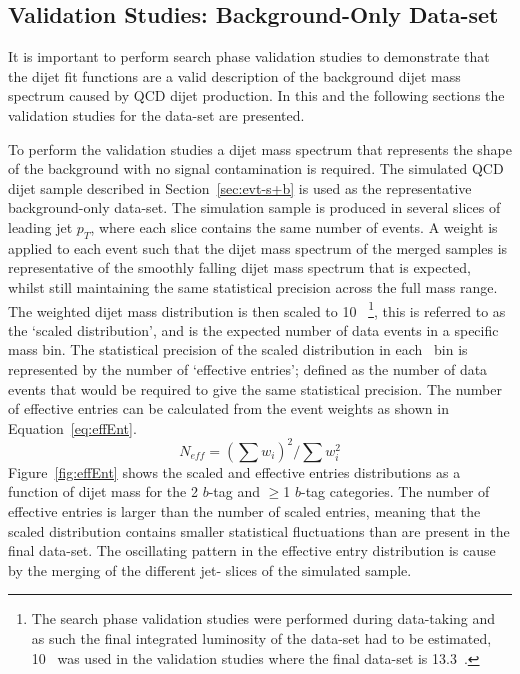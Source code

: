 \subsection{Validation Studies: Background-Only Data-set}
\label{sec:bkg-summer_fitCR}

It is important to perform search phase validation studies to demonstrate
that the dijet fit functions are a valid description of the background dijet mass spectrum caused by QCD dijet production.
In this and the following sections the validation studies for the \summer{} data-set are presented.

To perform the validation studies a dijet mass spectrum that represents the shape of the background with no signal contamination is required.
The simulated QCD dijet sample described in Section~\ref{sec:evt-s+b} is used as the representative background-only data-set.
The simulation sample is produced in several slices of leading jet $p_{T}$, where each slice contains the same number of events.
A weight is applied to each event such that the dijet mass spectrum of the merged samples is representative of the smoothly falling dijet mass spectrum that is expected,
whilst still maintaining the same statistical precision across the full mass range.
The weighted dijet mass distribution is then scaled to 10~\ifb{}
\footnote{
  The search phase validation studies were performed during data-taking
  and as such the final integrated luminosity of the data-set had to be estimated,
  10~\ifb{} was used in the validation studies where the final data-set is 13.3~\ifb{}.
},
this is referred to as the  `scaled distribution', and is the expected number of data events in a specific mass bin. 
The statistical precision of the scaled distribution in each \mjj{}~bin is represented by the number of `effective entries';
defined as the number of data events that would be required to give the same statistical precision.
 The number of effective entries can be calculated from the event weights as shown in Equation~\ref{eq:effEnt}.
\begin{equation}
  N_{eff} = (\sum{w_i})^2 / \sum{w_i^2}
  \label{eq:effEnt}
\end{equation}
Figure~\ref{fig:effEnt} shows the scaled and effective entries distributions as a function of dijet mass for the 2 $b$-tag and $\geq$1 $b$-tag categories.
The number of effective entries is larger than the number of scaled entries,
meaning that the scaled distribution contains smaller statistical fluctuations than are present in the final data-set.
The oscillating pattern in the effective entry distribution is cause by the merging of the different jet-\pT{} slices of the simulated sample. 

